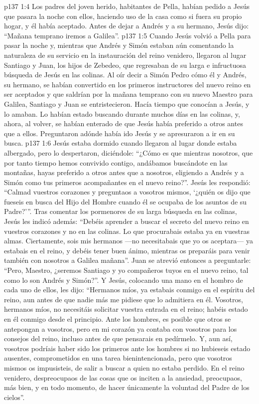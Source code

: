 \vs p137 1:4 \pc Los padres del joven herido, habitantes de Pella, habían pedido a Jesús que pasara la noche con ellos, haciendo uso de la casa como si fuera su propio hogar, y él había aceptado. Antes de dejar a Andrés y a su hermano, Jesús dijo: “Mañana temprano iremos a Galilea”.
\vs p137 1:5 \pc Cuando Jesús volvió a Pella para pasar la noche y, mientras que Andrés y Simón estaban aún comentando la naturaleza de su servicio en la instauración del reino venidero, llegaron al lugar Santiago y Juan, los hijos de Zebedeo, que regresaban de su larga e infructuosa búsqueda de Jesús en las colinas. Al oír decir a Simón Pedro cómo él y Andrés, su hermano, se habían convertido en los primeros instructores del nuevo reino en ser aceptados y que saldrían por la mañana temprano con su nuevo Maestro para Galilea, Santiago y Juan se entristecieron. Hacía tiempo que conocían a Jesús, y lo amaban. Lo habían estado buscando durante muchos días en las colinas, y, ahora, al volver, se habían enterado de que Jesús había preferido a otros antes que a ellos. Preguntaron adónde había ido Jesús y se apresuraron a ir en su busca.
\vs p137 1:6 Jesús estaba dormido cuando llegaron al lugar donde estaba albergado, pero lo despertaron, diciéndole: “¿Cómo es que mientras nosotros, que por tanto tiempo hemos convivido contigo, andábamos buscándote en las montañas, hayas preferido a otros antes que a nosotros, eligiendo a Andrés y a Simón como tus primeros acompañantes en el nuevo reino?”. Jesús les respondió: “Calmad vuestros corazones y preguntaos a vosotros mismos, ‘¿quién os dijo que fueseis en busca del Hijo del Hombre cuando él se ocupaba de los asuntos de su Padre?’”. Tras comentar los pormenores de su larga búsqueda en las colinas, Jesús les indicó además: “Debéis aprender a buscar el secreto del nuevo reino en vuestros corazones y no en las colinas. Lo que procurabais estaba ya en vuestras almas. Ciertamente, sois mis hermanos ---no necesitabais que yo os aceptara--- ya estabais en el reino, y debéis tener buen ánimo, mientras os preparáis para venir también con nosotros a Galilea mañana”. Juan se atrevió entonces a preguntarle: “Pero, Maestro, ¿seremos Santiago y yo compañeros tuyos en el nuevo reino, tal como lo son Andrés y Simón?”. Y Jesús, colocando una mano en el hombro de cada uno de ellos, les dijo: “Hermanos míos, ya estabais conmigo en el espíritu del reino, aun antes de que nadie más me pidiese que lo admitiera en él. Vosotros, hermanos míos, no necesitáis solicitar vuestra entrada en el reino; habéis estado en él conmigo desde el principio. Ante los hombres, es posible que otros se antepongan a vosotros, pero en mi corazón ya contaba con vosotros para los consejos del reino, incluso antes de que pensarais en pedírmelo. Y, aun así, vosotros podríais haber sido los primeros ante los hombres si no hubieseis estado ausentes, comprometidos en una tarea bienintencionada, pero que vosotros mismos os impusisteis, de salir a buscar a quien no estaba perdido. En el reino venidero, despreocupaos de las cosas que os inciten a la ansiedad, preocupaos, más bien, y en todo momento, de hacer únicamente la voluntad del Padre de los cielos”.
